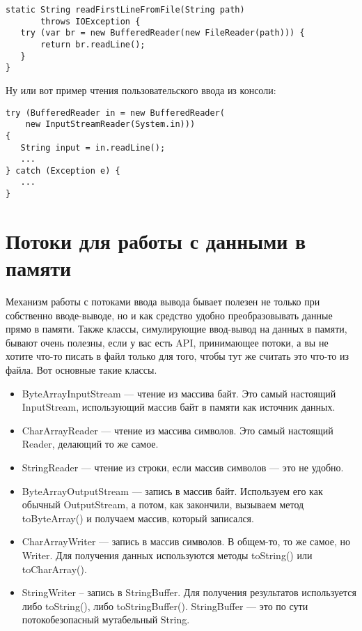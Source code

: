 \documentclass[a5paper]{article}
\begin{document}
\begin{verbatim}
static String readFirstLineFromFile(String path)
       throws IOException {
   try (var br = new BufferedReader(new FileReader(path))) {
       return br.readLine();
   }
}
\end{verbatim}

Ну или вот пример чтения пользовательского ввода из консоли:
\begin{verbatim}
try (BufferedReader in = new BufferedReader(
    new InputStreamReader(System.in))) 
{
   String input = in.readLine();
   ...
} catch (Exception e) {
   ...
}
\end{verbatim}

\section{Потоки для работы с данными в памяти}

Механизм работы с  потоками ввода вывода бывает полезен не только при собственно вводе-выводе, но и как средство удобно преобразовывать данные прямо в памяти. Также классы, симулирующие ввод-вывод на данных в памяти, бывают очень полезны, если у вас есть API, принимающее потоки, а вы не хотите что-то писать в файл только для того, чтобы тут же считать это что-то из файла. Вот основные такие классы.

\begin{itemize}
	\item ByteArrayInputStream --- чтение из массива байт. Это самый настоящий InputStream, использующий массив байт в памяти как источник данных.
	\item CharArrayReader --- чтение из массива символов. Это самый настоящий Reader, делающий то же самое.
	\item StringReader --- чтение из строки, если массив символов --- это не удобно.
	\item ByteArrayOutputStream --- запись в массив байт. Используем его как обычный OutputStream, а потом, как закончили, вызываем метод toByteArray() и получаем массив, который записался.
	\item CharArrayWriter --- запись в массив символов. В общем-то, то же самое, но Writer. Для получения данных используются методы toString() или toCharArray().
	\item StringWriter – запись в StringBuffer. Для получения результатов используется либо toString(), либо toStringBuffer(). StringBuffer --- это по сути потокобезопасный мутабельный String.
\end{itemize}
\end{document}
